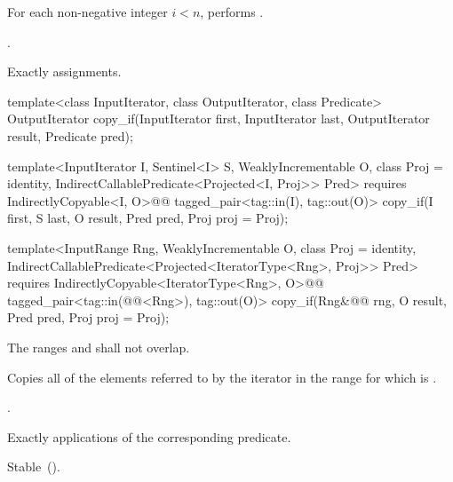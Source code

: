 \begin{itemdescr}
\pnum
\effects For each non-negative integer
$i < n$, performs .

\pnum
\returns {}.

\pnum
\complexity Exactly  assignments.
\end{itemdescr}

%
\begin{removedblock}
\begin{itemdecl}
template<class InputIterator, class OutputIterator, class Predicate>
  OutputIterator copy_if(InputIterator first, InputIterator last,
                         OutputIterator result, Predicate pred);
\end{itemdecl}
\end{removedblock}
\begin{addedblock}
\begin{itemdecl}
template<InputIterator I, Sentinel<I> S, WeaklyIncrementable O, class Proj = identity,
    IndirectCallablePredicate<Projected<I, Proj>> Pred>
  requires IndirectlyCopyable<I, O>@\newtxt{()}@
  tagged_pair<tag::in(I), tag::out(O)>
    copy_if(I first, S last, O result, Pred pred, Proj proj = Proj{});

template<InputRange Rng, WeaklyIncrementable O, class Proj = identity,
    IndirectCallablePredicate<Projected<IteratorType<Rng>, Proj>> Pred>
  requires IndirectlyCopyable<IteratorType<Rng>, O>@\newtxt{()}@
  tagged_pair<tag::in(@@<Rng>), tag::out(O)>
    copy_if(Rng&@\newtxt{\&}@ rng, O result, Pred pred, Proj proj = Proj{});
\end{itemdecl}
\end{addedblock}

\begin{itemdescr}
\pnum
\requires The ranges  and  shall not overlap.

\pnum
\effects Copies all of the elements referred to by the iterator  in the range 
for which  is .

\pnum
\returns {}.

\pnum
\complexity Exactly  applications of the corresponding predicate.

\pnum
\remarks Stable~().
\end{itemdescr}


